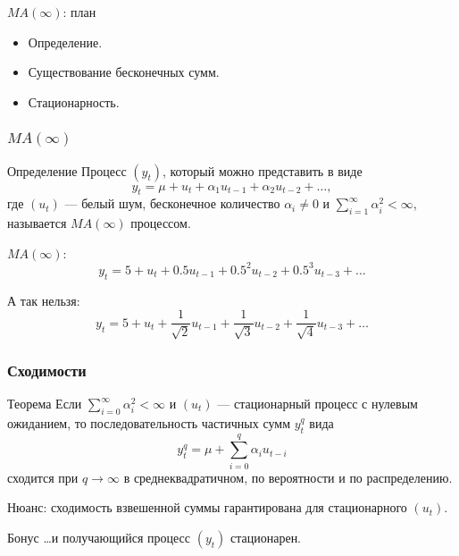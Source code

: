 
\begin{frame} %


\end{frame}



\begin{frame}{$MA(\infty)$: план}
  \begin{itemize}[<+->]
    \item Определение.
    \item Существование бесконечных сумм. 
    \item Стационарность.
  \end{itemize}
\end{frame}

\begin{frame}
  \frametitle{$MA(\infty)$}

  \begin{block}{Определение}
    Процесс $(y_t)$, который \alert{можно} представить в виде
    \[
    y_t = \mu + u_t + \alpha_1 u_{t-1} + \alpha_2 u_{t-2} + \ldots,
    \]
    где $(u_t)$ — белый шум, бесконечное количество $\alpha_i \neq 0$ и 
    $\sum_{i=1}^{\infty} \alpha_i^2 < \infty$, 
    называется $MA(\infty)$ процессом. 
  \end{block}

  \pause 
  $MA(\infty)$:
  \[
  y_t = 5 + u_t + 0.5 u_{t-1} + 0.5^2 u_{t-2} + 0.5^3 u_{t-3} + \ldots
  \]

  \pause
  А \alert{так нельзя}:
  \[
   y_t = 5 + u_t + \frac{1}{\sqrt{2}}u_{t-1} + \frac{1}{\sqrt{3}} u_{t-2} + \frac{1}{\sqrt{4}} u_{t-3} + \ldots
  \]

\end{frame}

\begin{frame}
  \frametitle{Сходимости}
  \begin{block}{Теорема}
    Если 
    $\sum_{i=0}^{\infty} \alpha_i^2 < \infty$ и $(u_t)$ — стационарный процесс с нулевым ожиданием, 
    то последовательность частичных сумм $y^q_t$ вида 
    \[
      y^q_t = \mu + \sum_{i=0}^q \alpha_i u_{t-i}
    \]
  сходится при $q \to \infty$  \alert{в среднеквадратичном}, \alert{по вероятности} и \alert{по распределению}.
  \end{block}

  Нюанс: сходимость взвешенной суммы гарантирована для стационарного $(u_t)$.  
  \pause
  \begin{block}{Бонус}
    \ldots и получающийся процесс $(y_t)$ стационарен.
  \end{block}
\end{frame}


